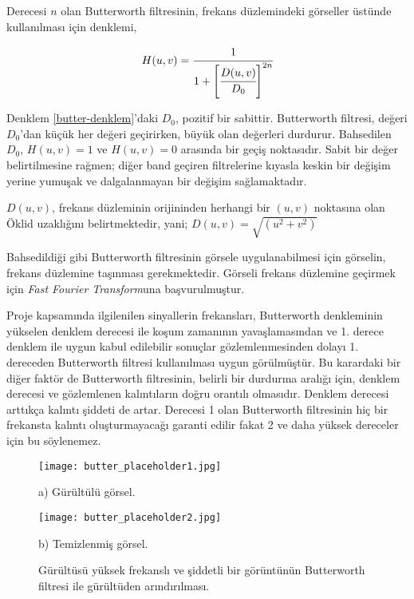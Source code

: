 \documentclass[a4paper, 12pt]{article}
\begin{document}
Derecesi $n$ olan Butterworth filtresinin, frekans düzlemindeki görseller üstünde kullanılması için denklemi,

\begin{equation}
	H(u,v) = \cfrac{1}{1+\left[\cfrac{D(u,v)}{D_0}\right]^{2n}}
	\label{butter-denklem}
\end{equation}

Denklem \ref{butter-denklem}'daki $D_0$, pozitif bir sabittir. Butterworth filtresi, değeri $D_0$'dan küçük her değeri geçirirken, büyük olan değerleri durdurur. Bahsedilen $D_0$, $H(u,v)=1$ ve $H(u,v)=0$ arasında bir geçiş noktasıdır. Sabit bir değer belirtilmesine rağmen; diğer band geçiren filtrelerine kıyasla keskin bir değişim yerine yumuşak ve dalgalanmayan bir değişim sağlamaktadır.

$D(u,v)$, frekans düzleminin orijininden herhangi bir $(u,v)$ noktasına olan Öklid uzaklığını belirtmektedir, yani; $D(u,v)=\sqrt{(u^2+v^2)}$



Bahsedildiği gibi Butterworth filtresinin görsele uygulanabilmesi için görselin, frekans düzlemine taşınması gerekmektedir. Görseli frekans düzlemine geçirmek için \textit{Fast Fourier Transform}una başvurulmuştur. 

Proje kapsamında ilgilenilen sinyallerin frekansları, Butterworth denkleminin yükselen denklem derecesi ile koşum zamanının yavaşlamasından ve 1. derece denklem ile uygun kabul edilebilir sonuçlar gözlemlenmesinden dolayı 1. dereceden Butterworth filtresi kullanılması uygun görülmüştür. Bu karardaki bir diğer faktör de Butterworth filtresinin, belirli bir durdurma aralığı için, denklem derecesi ve gözlemlenen kalıntıların doğru orantılı olmasıdır. Denklem derecesi arttıkça kalıntı şiddeti de artar. Derecesi 1 olan Butterworth filtresinin hiç bir frekansta kalıntı oluşturmayacağı garanti edilir fakat 2 ve daha yüksek dereceler için bu söylenemez. 
\begin{figure}[ht]
    \centering
    \begin{minipage}{0.35\textwidth}
        \centering
	    \texttt{[image: butter\_placeholder1.jpg]} %
	    \caption*{a) Gürültülü görsel.}
    \end{minipage}\hspace{1cm}
    \begin{minipage}{0.35\textwidth}
        \centering
        \texttt{[image: butter\_placeholder2.jpg]} %
	    \caption*{b) Temizlenmiş görsel.}
    \end{minipage}
	\caption{Gürültüsü yüksek frekanslı ve şiddetli bir görüntünün Butterworth filtresi ile gürültüden arındırılması.}
	\label{butter-ornek}
\end{figure}
\end{document}

